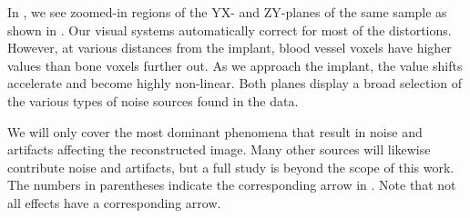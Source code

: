 In , we see zoomed-in regions of the YX- and ZY-planes of the
same sample as shown in .  Our visual systems
automatically correct for most of the distortions. However, at various
distances from the implant, blood vessel voxels have higher values than bone
voxels further out. As we approach the implant, the value shifts accelerate and
become highly non-linear.  Both planes display a broad selection of the various
types of noise sources found in the data.

We will only cover the most dominant phenomena that result in noise
and artifacts affecting the reconstructed image. Many other sources will
likewise contribute noise and artifacts, but a full study is beyond the scope
of this work. The numbers in parentheses indicate the corresponding arrow in
. Note that not all effects have a corresponding arrow.

